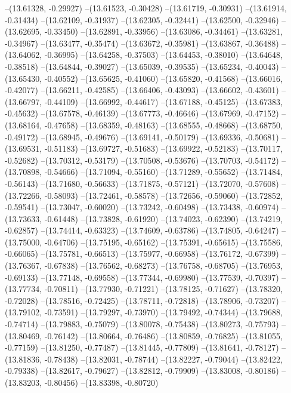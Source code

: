 --(13.61328, -0.29927)
--(13.61523, -0.30428)
--(13.61719, -0.30931)
--(13.61914, -0.31434)
--(13.62109, -0.31937)
--(13.62305, -0.32441)
--(13.62500, -0.32946)
--(13.62695, -0.33450)
--(13.62891, -0.33956)
--(13.63086, -0.34461)
--(13.63281, -0.34967)
--(13.63477, -0.35474)
--(13.63672, -0.35981)
--(13.63867, -0.36488)
--(13.64062, -0.36995)
--(13.64258, -0.37503)
--(13.64453, -0.38010)
--(13.64648, -0.38518)
--(13.64844, -0.39027)
--(13.65039, -0.39535)
--(13.65234, -0.40043)
--(13.65430, -0.40552)
--(13.65625, -0.41060)
--(13.65820, -0.41568)
--(13.66016, -0.42077)
--(13.66211, -0.42585)
--(13.66406, -0.43093)
--(13.66602, -0.43601)
--(13.66797, -0.44109)
--(13.66992, -0.44617)
--(13.67188, -0.45125)
--(13.67383, -0.45632)
--(13.67578, -0.46139)
--(13.67773, -0.46646)
--(13.67969, -0.47152)
--(13.68164, -0.47658)
--(13.68359, -0.48163)
--(13.68555, -0.48668)
--(13.68750, -0.49172)
--(13.68945, -0.49676)
--(13.69141, -0.50179)
--(13.69336, -0.50681)
--(13.69531, -0.51183)
--(13.69727, -0.51683)
--(13.69922, -0.52183)
--(13.70117, -0.52682)
--(13.70312, -0.53179)
--(13.70508, -0.53676)
--(13.70703, -0.54172)
--(13.70898, -0.54666)
--(13.71094, -0.55160)
--(13.71289, -0.55652)
--(13.71484, -0.56143)
--(13.71680, -0.56633)
--(13.71875, -0.57121)
--(13.72070, -0.57608)
--(13.72266, -0.58093)
--(13.72461, -0.58578)
--(13.72656, -0.59060)
--(13.72852, -0.59541)
--(13.73047, -0.60020)
--(13.73242, -0.60498)
--(13.73438, -0.60974)
--(13.73633, -0.61448)
--(13.73828, -0.61920)
--(13.74023, -0.62390)
--(13.74219, -0.62857)
--(13.74414, -0.63323)
--(13.74609, -0.63786)
--(13.74805, -0.64247)
--(13.75000, -0.64706)
--(13.75195, -0.65162)
--(13.75391, -0.65615)
--(13.75586, -0.66065)
--(13.75781, -0.66513)
--(13.75977, -0.66958)
--(13.76172, -0.67399)
--(13.76367, -0.67838)
--(13.76562, -0.68273)
--(13.76758, -0.68705)
--(13.76953, -0.69133)
--(13.77148, -0.69558)
--(13.77344, -0.69980)
--(13.77539, -0.70397)
--(13.77734, -0.70811)
--(13.77930, -0.71221)
--(13.78125, -0.71627)
--(13.78320, -0.72028)
--(13.78516, -0.72425)
--(13.78711, -0.72818)
--(13.78906, -0.73207)
--(13.79102, -0.73591)
--(13.79297, -0.73970)
--(13.79492, -0.74344)
--(13.79688, -0.74714)
--(13.79883, -0.75079)
--(13.80078, -0.75438)
--(13.80273, -0.75793)
--(13.80469, -0.76142)
--(13.80664, -0.76486)
--(13.80859, -0.76825)
--(13.81055, -0.77159)
--(13.81250, -0.77487)
--(13.81445, -0.77809)
--(13.81641, -0.78127)
--(13.81836, -0.78438)
--(13.82031, -0.78744)
--(13.82227, -0.79044)
--(13.82422, -0.79338)
--(13.82617, -0.79627)
--(13.82812, -0.79909)
--(13.83008, -0.80186)
--(13.83203, -0.80456)
--(13.83398, -0.80720)
